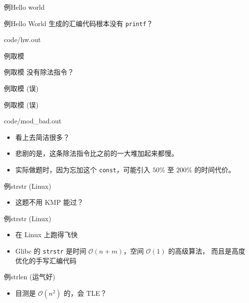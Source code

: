 \documentclass[10pt,mathserif]{beamer}
\newcommand{\lstcode}[1] {  }
\newcommand{\lstterm}[1] {  }
\begin{document}
\begin{frame}{例}{Hello world}
	\lstcode{hw.cc}
\end{frame}

\begin{frame}{例}{Hello World}
	生成的汇编代码根本没有 \texttt{printf}？
	
	{code/hw.out}
\end{frame}

\begin{frame}{例}{取模}
	\lstcode{mod.cc}
\end{frame}

\begin{frame}{例}{取模}
	没有除法指令？
	\lstterm{mod.out}
\end{frame}

\begin{frame}{例}{取模 (误)}
	\lstcode{mod_bad.cc}
\end{frame}

\begin{frame}{例}{取模 (误)}
	
	{code/mod_bad.out}
	\begin{itemize}
		\item 看上去简洁很多？
		\item 悲剧的是，这条除法指令比之前的一大堆加起来都慢。
		\item 实际做题时，因为忘加这个 \texttt{const}，可能引入
			$50\%$ 至 $200\%$ 的时间代价。
	\end{itemize}
\end{frame}

\begin{frame}{例}{strstr (Linux)}
	\lstcode{strstr.cc}
	\begin{itemize}
		\item 这题不用 KMP 能过？
	\end{itemize}
\end{frame}

\begin{frame}{例}{strstr (Linux)}
	\lstterm{strstr.out}
	\begin{itemize}
		\item 在 Linux 上跑得飞快
		\item Glibc 的 \lstinline{strstr} 是时间
			$\mathcal{O}(n + m)$，空间 $\mathcal{O}(1)$ 的高级算法，
			而且是高度优化的手写汇编代码
	\end{itemize}
\end{frame}

\begin{frame}{例}{strlen (运气好)}
	\lstcode{strlen-1.cc}
	\begin{itemize}
		\item 目测是 $\mathcal{O}(n^2)$ 的，会 TLE？
	\end{itemize}
\end{frame}
\end{document}
